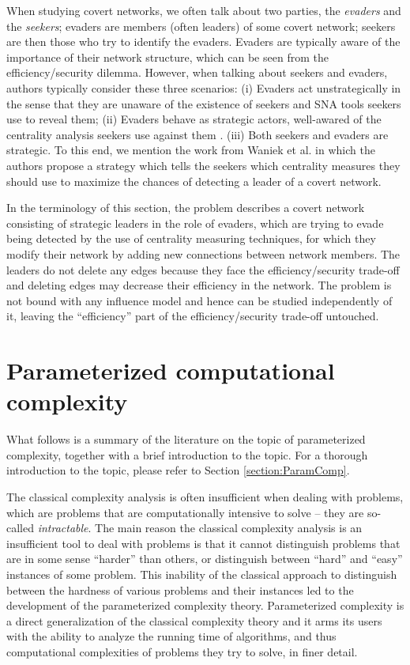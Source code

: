 When studying covert networks, we often talk about two parties, the \emph{evaders} and the \emph{seekers};
evaders are members (often leaders) of some covert network;
seekers are then those who try to identify the evaders.
Evaders are typically aware of the importance of their network structure, which can be seen from
the efficiency/security dilemma.
However, when talking about seekers and evaders, authors typically consider these three scenarios:
(i) Evaders act unstrategically in the sense that they are unaware of
the existence of seekers and SNA tools seekers use to reveal them;
(ii) Evaders behave as strategic actors, well-awared of the centrality analysis
seekers use against them \cite{Waniek2017,Dey2019,Waniek2016,Dey2020}.
(iii) Both seekers and evaders are strategic.
To this end, we mention the work from Waniek et al. \cite{Waniek2021} in which the authors propose a strategy
which tells the seekers which centrality measures they should use
to maximize the chances of detecting a leader of a covert network.

In the terminology of this section, the \HL problem describes a covert network consisting of strategic leaders
in the role of evaders, which are trying to evade being detected by the use of centrality measuring techniques,
for which they modify their network by adding new connections between network members.
The leaders do not delete any edges because they face the efficiency/security trade-off and
deleting edges may decrease their efficiency in the network.
The problem is not bound with any influence model and hence can be studied independently of it,
leaving the ``efficiency'' part of the efficiency/security trade-off untouched.


\section{Parameterized computational complexity}\label{section:litRev:ParamCompl}

What follows is a summary of the literature on the topic of parameterized complexity,
together with a brief introduction to the topic.
For a thorough introduction to the topic, please refer to Section \ref{section:ParamComp}.

The classical complexity analysis is often insufficient when dealing with \NPh problems,
which are problems that are computationally intensive to solve --
they are so-called \emph{intractable}.
The main reason the classical complexity analysis is an insufficient tool to deal with \NPh problems is that
it cannot distinguish \NPh problems that are in some sense ``harder'' than others,
or distinguish between ``hard'' and ``easy'' instances of some \NPh problem.
This inability of the classical approach to distinguish between the hardness of various \NPh problems and their instances
led to the development of the parameterized complexity theory.
Parameterized complexity is a direct generalization of the classical complexity theory and it arms its users
with the ability to analyze the running time of algorithms, and thus computational complexities of problems
they try to solve, in finer detail.

